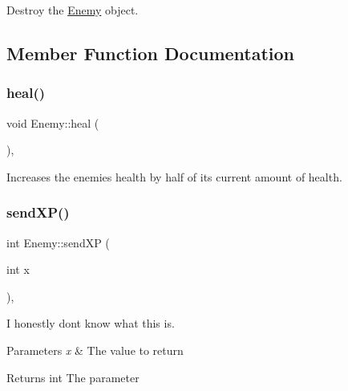 Destroy the \mbox{\hyperlink{classEnemy}{Enemy}} object. 



\subsection{Member Function Documentation}
\mbox{\label{classEnemy_a5f7ddbe448758f4a8eef7d846903ce99}} 
\subsubsection{\texorpdfstring{heal()}{heal()}}
{\footnotesize\ttfamily void Enemy\+::heal (\begin{DoxyParamCaption}{ }\end{DoxyParamCaption})\hspace{0.3cm}{\ttfamily [protected]}, {\ttfamily [virtual]}}



Increases the enemies health by half of it\textquotesingle{}s current amount of health. 

\mbox{\label{classEnemy_a755e7d44eb291517f28e9cad2c6c7111}} 
\subsubsection{\texorpdfstring{sendXP()}{sendXP()}}
{\footnotesize\ttfamily int Enemy\+::send\+XP (\begin{DoxyParamCaption}\item[{int}]{x }\end{DoxyParamCaption})\hspace{0.3cm}{\ttfamily [protected]}, {\ttfamily [virtual]}}



I honestly don\textquotesingle{}t know what this is. 


\begin{DoxyParams}{Parameters}
{\em x} & The value to return \\
\hline
\end{DoxyParams}
\begin{DoxyReturn}{Returns}
int The parameter 
\end{DoxyReturn}
\mbox{\label{classEnemy_ae01c62a474fbcd547000ff1068976d49}} 
